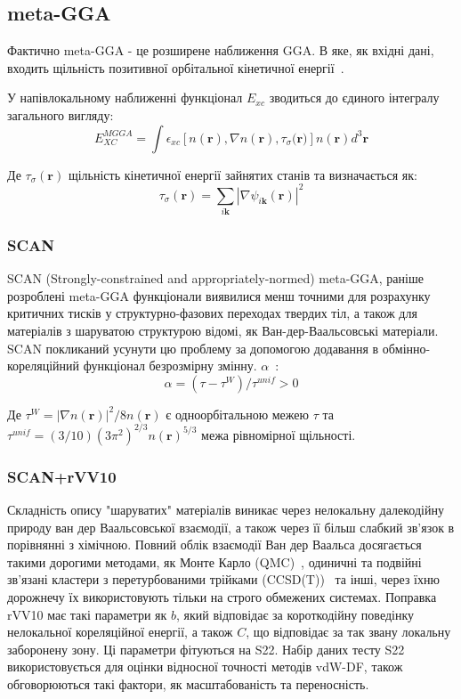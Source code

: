 \subsection{meta-GGA}
Фактично meta-GGA - це розширене наближення GGA. В яке, як вхідні дані, входить щільність позитивної орбітальної кінетичної енергії~\cite{Swapan&Gosh&Parr, Becke&Roussel, Tao&Perdew}.

У напівлокальному наближенні функціонал $E_{xc}$ зводиться до єдиного інтегралу загального вигляду:
\begin{equation}
    E_{XC}^{MGGA} = \int{\epsilon_{xc}[n(\textbf{r}),\nabla{n(\textbf{r}),\tau_{\sigma}(\textbf{r}})]}n(\textbf{r})d^3\textbf{r}
\end{equation}

Де $\tau_{\sigma}(\textbf{r})$ щільність кінетичної енергії зайнятих станів та визначається як:
\begin{equation}
    \tau_{\sigma}(\textbf{r}) = \sum\limits_{i\textbf{k}}|\nabla\psi_{i\textbf{k}}(\textbf{r})|^2
\end{equation}
\subsubsection{SCAN}
SCAN (Strongly-constrained and appropriately-normed) meta-GGA, раніше розроблені meta-GGA функціонали виявилися менш точними для розрахунку критичних тисків у структурно-фазових переходах твердих тіл, а також для матеріалів з шаруватою структурою відомі, як Ван-дер-Ваальсовські матеріали. SCAN покликаний усунути цю проблему за допомогою додавання в обмінно-кореляційний функціонал безрозмірну змінну.
$\alpha$~\cite{SCAN}:
\begin{equation}
    \alpha = (\tau - \tau^W)/\tau^{unif} > 0
\end{equation}

Де $\tau^W = |\nabla{n(\textbf{r})}|^2/8n(\textbf{r})$ є одноорбітальною межею $\tau$ \newline та $\tau^{unif} = (3/10)(3\pi^2)^{2/3}n(\textbf{r})^{5/3}$ межа рівномірної щільності.
\subsubsection{SCAN+rVV10}
Складність опису "шаруватих" матеріалів виникає через нелокальну далекодійну природу ван дер Ваальсовської взаємодії, а також через її більш слабкий зв'язок в порівнянні з хімічною. Повний облік взаємодії Ван дер Ваальса досягається такими дорогими методами, як Монте Карло (QMC)~\cite{QMC}, одиничні та подвійні зв'язані кластери з перетурбованими трійками (CCSD(T))~\cite{CCSD(T)} та інші, через їхню дорожнечу їх використовують тільки на строго обмежених системах. Поправка rVV10 має такі параметри як $b$, який відповідає за короткодійну поведінку нелокальної кореляційної енергії, а також $C$, що відповідає за так звану локальну заборонену зону. Ці параметри фітуються на S22. Набір даних тесту S22~\cite{S22} використовується для оцінки відносної точності методів vdW-DF, також обговорюються такі фактори, як масштабованість та переносність.